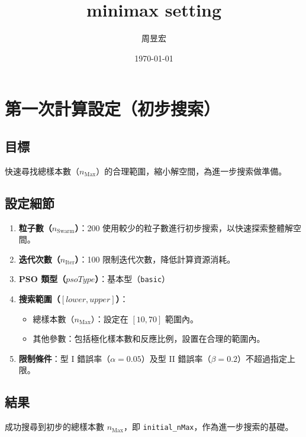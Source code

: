 
\title{minimax setting}
\author{{周昱宏}}
\date{{\TT \today}}

\maketitle
\fontsize{12}{22 pt}\selectfont
\doublespacing

\section{第一次計算設定（初步搜索）}

\subsection*{目標}
快速尋找總樣本數（$n_{\text{Max}}$）的合理範圍，縮小解空間，為進一步搜索做準備。

\subsection*{設定細節}
\begin{enumerate}[1.]
    \item \textbf{粒子數（$n_{\text{Swarm}}$）}：200  
          使用較少的粒子數進行初步搜索，以快速探索整體解空間。
    \item \textbf{迭代次數（$n_{\text{Iter}}$）}：100  
          限制迭代次數，降低計算資源消耗。
    \item \textbf{PSO 類型（$psoType$）}：基本型（\texttt{basic}）  
    
    \item \textbf{搜索範圍（$[lower, upper]$）}：
          \begin{itemize}
              \item 總樣本數（$n_{\text{Max}}$）：設定在 $[10, 70]$ 範圍內。
              \item 其他參數：包括極化樣本數和反應比例，設置在合理的範圍內。
          \end{itemize}
    \item \textbf{限制條件}：型 I 錯誤率（$\alpha = 0.05$）及型 II 錯誤率（$\beta = 0.2$）不超過指定上限。
\end{enumerate}

\subsection{結果}
成功搜尋到初步的總樣本數 $n_{\text{Max}}$，即 \texttt{initial\_nMax}，作為進一步搜索的基礎。


